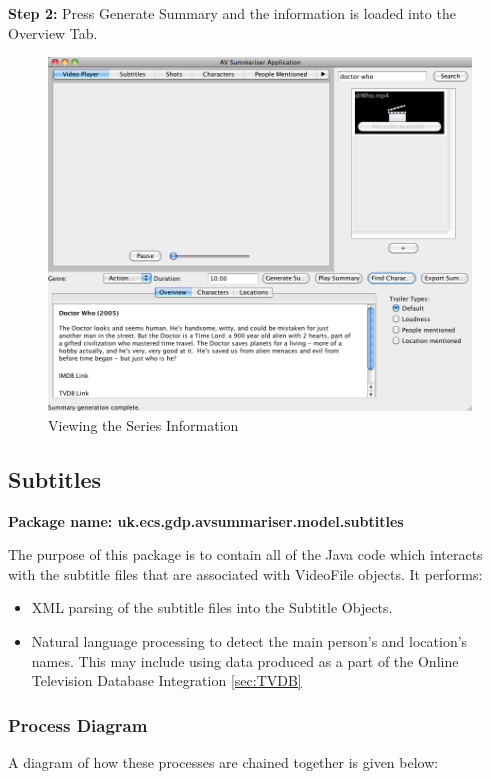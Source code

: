 \textbf{Step 2:} Press Generate Summary and the information is loaded into the Overview Tab. 
\begin{figure}[ht]
\begin{center}
 \includegraphics[scale=0.31]{Images/TVDBWalkthrough2.png}
  \caption{Viewing the Series Information}
 \end{center}
\end{figure}

\newpage

\subsection{Subtitles}
\label{sec:Subtitles}

\textbf{Package name: uk.ecs.gdp.avsummariser.model.subtitles}

The purpose of this package is to contain all of the Java code which interacts with the subtitle files that are associated with VideoFile objects. It performs:
\begin{itemize}
	\item{XML parsing of the subtitle files into the Subtitle Objects.}
	\item{Natural language processing to detect the main person's and location's names. This may include using data produced as a part of the Online Television Database Integration \ref{sec:TVDB}}
\end{itemize}

\subsubsection{Process Diagram}
A diagram of how these processes are chained together is given below:

